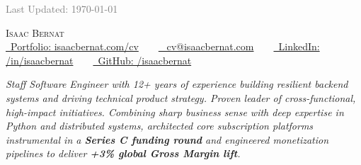 \documentclass[a4paper,11pt]{article}
\begin{document}
\noindent\textcolor{grey}{\small\hfill Last Updated: \today}
\vspace{-1em} %

\begin{center}
    {\Huge \scshape Isaac Bernat} \\ \vspace{1pt}
    \small 
    \href{https://www.isaacbernat.com/cv}{\raisebox{-0.1\height}\faLink\ Portfolio: isaacbernat.com/cv} ~ \textbullet ~
    \href{mailto:cv@isaacbernat.com}{\raisebox{-0.1\height}\faEnvelope\ 
    cv@isaacbernat.com} ~ \textbullet ~
    \href{https://linkedin.com/in/isaacbernat}{\raisebox{-0.1\height}\faLinkedin\ LinkedIn: /in/isaacbernat} ~ \textbullet ~
    \href{https://github.com/isaacbernat}{\raisebox{-0.1\height}\faGithub\ GitHub: /isaacbernat}
    \vspace{-8pt}
\end{center}



\vspace{-0.2em} %
\begin{center}
    \begin{minipage}{0.85\textwidth}  %
        \small \textit{Staff Software Engineer with 12+ years of experience building resilient backend systems and driving technical product strategy. Proven leader of cross-functional, high-impact initiatives. Combining sharp business sense with deep expertise in Python and distributed systems, architected core subscription platforms instrumental in a \textbf{Series C funding round} and engineered monetization pipelines to deliver \textbf{+3\% global Gross Margin lift}.}
        
    \end{minipage}
\end{center}
\vspace{-1.1em} %


\end{document}
